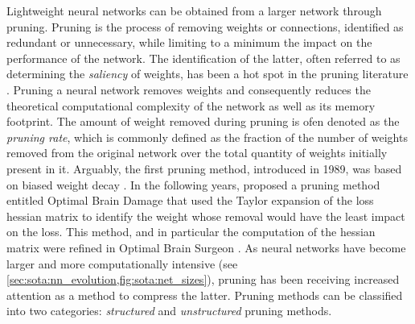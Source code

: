 Lightweight neural networks can be obtained from a larger network through
pruning. Pruning is the process of removing weights or connections, identified
as redundant or unnecessary, while limiting to a minimum the impact on the
performance of the network. The identification of the latter, often referred to
as determining the \emph{saliency} of weights, has been a hot spot in the
pruning literature \cite{li2023model,cheng2017survey,liang2021pruning}. Pruning
a neural network removes weights and consequently reduces the theoretical
computational complexity of the network as well as its memory footprint.  The
amount of weight removed during pruning is ofen denoted as the \emph{pruning
rate}, which is commonly defined as the fraction of the number of weights
removed from the original network over the total quantity of weights initially
present in it. Arguably, the first pruning method, introduced in 1989, was based
on biased weight decay \cite{hanson1988comparing}. In the following years,
\citeauthor{DBLP:conf/nips/CunDS89} proposed a pruning method entitled Optimal
Brain Damage that used the Taylor expansion of the loss hessian matrix to
identify the weight whose removal would have the least impact on the loss. This
method, and in particular the computation of the hessian matrix were refined in
Optimal Brain Surgeon
\cite{DBLP:conf/nips/HassibiS92,DBLP:conf/nips/HassibiSW93,DBLP:conf/icnn/HassibiSW93}.
As neural networks have become larger and more computationally intensive (see
\cref{sec:sota:nn_evolution,fig:sota:net_sizes}), pruning has been receiving
increased attention as a method to compress the latter. Pruning methods can be
classified into two categories: \emph{structured} and \emph{unstructured}
pruning methods.\\


